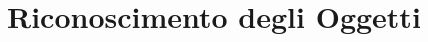 \chapter{Riconoscimento degli Oggetti}
\label{cap:riconoscimento}
\thispagestyle{empty}

\begin{quotation}
{\footnotesize
\noindent\emph{}
\begin{flushright}
\end{flushright}
}
\end{quotation}
\vspace{0.5cm}

